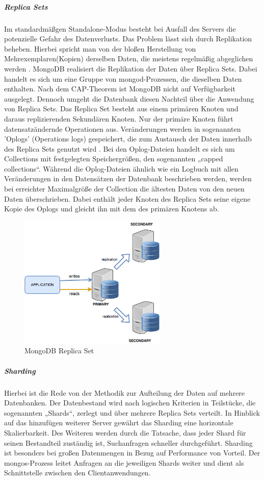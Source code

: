 \noindent
\subparagraph{Replica Sets}
Im standardmäßgen Standalone-Modus besteht bei Ausfall des Servers die potenzielle Gefahr des Datenverlusts. Das Problem lässt sich durch Replikation beheben. Hierbei spricht man von der bloßen Herstellung von Mehrexemplaren(Kopien) derselben Daten, die meistens regelmäßig abgeglichen werden \cite{DB3.6}. MongoDB realisiert die Replikation der Daten über Replica Sets\cite{DB3.7}. Dabei handelt es sich um eine Gruppe von mongod-Prozessen, die dieselben Daten enthalten. Nach dem CAP-Theorem ist MongoDB nicht auf Verfügbarkeit ausgelegt. Dennoch umgeht die Datenbank diesen Nachteil über die Anwendung von Replica Sets. Das Replica Set besteht aus einem primären Knoten und daraus replizierenden Sekundären Knoten.
Nur der primäre Knoten führt datensatzändernde Operationen aus. Veränderungen werden in sogenannten 'Oplogs' (Operations logs) gespeichert, die zum Austausch der Daten innerhalb des Replica Sets genutzt wird \cite{DB3.8}. Bei den Oplog-Dateien handelt es sich um Collections mit festgelegten Speichergrößen, den sogenannten „capped collections“. Während die Oplog-Dateien ähnlich wie ein Logbuch mit allen Veränderungen in den Datensätzen der Datenbank beschrieben werden, werden bei erreichter Maximalgröße der Collection die ältesten Daten von den neuen Daten überschrieben. Dabei enthält jeder Knoten des Replica Sets seine eigene Kopie des Oplogs und gleicht ihn mit dem des primären Knotens ab.

\begin{figure}[htb]
\centering
\includegraphics[width=7cm]{images/replicaset1.png}
\caption{MongoDB Replica Set}
\end{figure}


\noindent
\subparagraph{Sharding}
Hierbei ist die Rede von der Methodik zur Aufteilung der Daten auf mehrere Datenbanken\cite{DB4.1}.
Der Datenbestand wird nach logischen Kriterien in  Teilstücke, die sogenannten „Shards“, zerlegt und über mehrere Replica Sets verteilt.
In Hinblick auf das hinzufügen weiterer Server gewährt das Sharding eine horizontale Skalierbarkeit.
Des Weiteren werden durch die Tatsache, dass jeder Shard für seinen Bestandteil zuständig ist,  Suchanfragen schneller durchgeführt. 
Sharding ist besonders bei großen Datenmengen in Bezug auf Performance von Vorteil.
Der mongos-Prozess leitet Anfragen an die jeweiligen Shards weiter und dient als Schnittstelle zwischen den Clientanwendungen.

